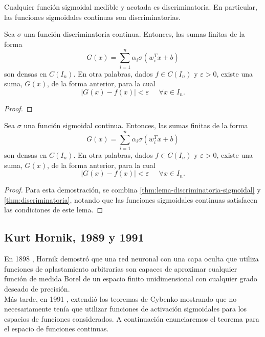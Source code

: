 \begin{lema}\label{thm:lema-discriminatoria-sigmoidal}
Cualquier función sigmoidal medible y acotada es discriminatoria. En particular, las funciones sigmoidales continuas son discriminatorias.
\end{lema}

\begin{teorema}\label{thm:discriminatoria}
Sea $\sigma$ una función discriminatoria continua. Entonces, las sumas finitas de la forma $$G(x)=\sum_{i=1}^n \alpha_i \sigma(w_i^Tx+b)$$ son densas en $C(I_n)$. En otra palabras, dados $f\in C(I_n)$ y $\varepsilon>0$, existe una suma, $G(x)$, de la forma anterior, para la cual $$|G(x)-f(x)|<\varepsilon \;\;\;\;\; \forall x \in I_n.$$
\end{teorema}
\begin{proof}
\end{proof}
\begin{teorema}\label{thm:sigmoidal}
Sea $\sigma$ una función sigmoidal continua. Entonces, las sumas finitas de la forma $$G(x)=\sum_{i=1}^n \alpha_i \sigma(w_i^Tx+b)$$ son densas en $C(I_n)$. En otra palabras, dados $f\in C(I_n)$ y $\varepsilon>0$, existe una suma, $G(x)$, de la forma anterior, para la cual $$|G(x)-f(x)|<\varepsilon \;\;\;\;\; \forall x \in I_n.$$
\end{teorema}
\begin{proof}
Para esta demostración, se combina \autoref{thm:lema-discriminatoria-sigmoidal} y \autoref{thm:discriminatoria}, notando que las funciones sigmoidales continuas satisfacen las condiciones de este lema.
\end{proof}

\subsection{Kurt Hornik, 1989 y 1991}

En 1898 \cite{HornikEtAl89}, Hornik demostró que una red neuronal con una capa oculta que utiliza funciones de aplastamiento arbitrarias son capaces de aproximar cualquier función de medida Borel de un espacio finito unidimensional con cualquier grado deseado de precisión.\\

Más tarde, en 1991 \cite{Kurt1991251}, extendió los teoremas de Cybenko mostrando que no necesariamente tenía que utilizar funciones de activación sigmoidales para los espacios de funciones considerados. A continuación enunciaremos el teorema para el espacio de funciones continuas.\\

